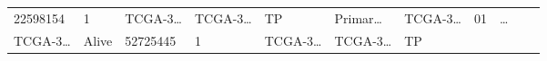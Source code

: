 \documentclass[
]{article}
\begin{document}
\begin{longtable}[]{@{}lllllllllll@{}}
\begin{minipage}[t]{0.06\columnwidth}
22598154\strut
\end{minipage} & \begin{minipage}[t]{0.07\columnwidth}\raggedright
1\strut
\end{minipage} & \begin{minipage}[t]{0.07\columnwidth}\raggedright
TCGA-3\ldots{}\strut
\end{minipage} & \begin{minipage}[t]{0.07\columnwidth}\raggedright
TCGA-3\ldots{}\strut
\end{minipage} & \begin{minipage}[t]{0.07\columnwidth}\raggedright
TP\strut
\end{minipage} & \begin{minipage}[t]{0.07\columnwidth}\raggedright
Primar\ldots{}\strut
\end{minipage} & \begin{minipage}[t]{0.09\columnwidth}\raggedright
TCGA-3\ldots{}\strut
\end{minipage} & \begin{minipage}[t]{0.10\columnwidth}\raggedright
01\strut
\end{minipage} & \begin{minipage}[t]{0.03\columnwidth}\raggedright
\ldots{}\strut
\end{minipage}\tabularnewline
\begin{minipage}[t]{0.07\columnwidth}\raggedright
TCGA-3\ldots{}\strut
\end{minipage} & \begin{minipage}[t]{0.04\columnwidth}\raggedright
Alive\strut
\end{minipage} & \begin{minipage}[t]{0.06\columnwidth}\raggedright
52725445\strut
\end{minipage} & \begin{minipage}[t]{0.07\columnwidth}\raggedright
1\strut
\end{minipage} & \begin{minipage}[t]{0.07\columnwidth}\raggedright
TCGA-3\ldots{}\strut
\end{minipage} & \begin{minipage}[t]{0.07\columnwidth}\raggedright
TCGA-3\ldots{}\strut
\end{minipage} & \begin{minipage}[t]{0.07\columnwidth}\raggedright
TP\strut
\end{minipage} & \begin{minipage}[t]{0.07\columnwidth}\raggedright

\end{minipage}
\end{longtable}
\end{document}
